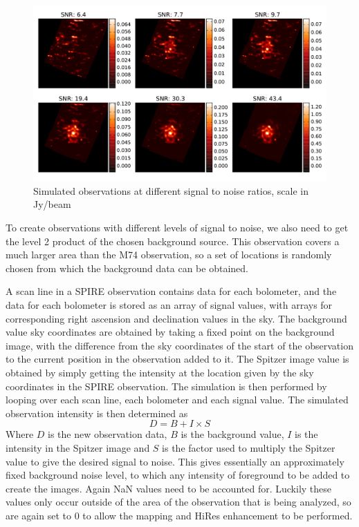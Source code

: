 \begin{figure}
    \centering
    \includegraphics[width=0.9\linewidth]{figures/simulated-observations.pdf}
    \caption[Simulated observations]{Simulated observations at different signal to noise ratios, scale in Jy/beam}
    \label{simulatedobs}
\end{figure}

To create observations with different levels of signal to noise, we also need to get the level 2 product of the chosen background source. This observation covers a much larger area than the M74 observation, so a set of locations is randomly chosen from which the background data can be obtained.

A scan line in a SPIRE observation contains data for each bolometer, and the data for each bolometer is stored as an array of signal values, with arrays for corresponding right ascension and declination values in the sky. The background value sky coordinates are obtained by taking a fixed point on the background image, with the difference from the sky coordinates of the start of the observation to the current position in the observation added to it. The Spitzer image value is obtained by simply getting the intensity at the location given by the sky coordinates in the SPIRE observation. The simulation is then performed by looping over each scan line, each bolometer and each signal value. The simulated observation intensity is then determined as
\[ D = B + I \times S \]
Where $D$ is the new observation data, $B$ is the background value, $I$ is the intensity in the Spitzer image and $S$ is the factor used to multiply the Spitzer value to give the desired signal to noise. This gives essentially an approximately fixed background noise level, to which any intensity of foreground to be added to create the images. Again NaN values need to be accounted for. Luckily these values only occur outside of the area of the observation that is being analyzed, so are again set to 0 to allow the mapping and HiRes enhancement to be performed.


